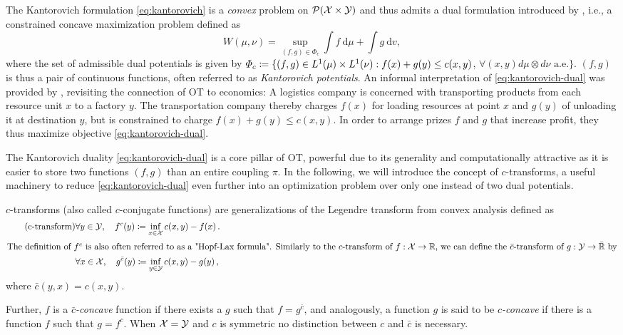 The Kantorovich formulation \eqref{eq:kantorovich} is a \emph{convex} problem on ${\mathcal{P}}(\mathcal{X} \times \mathcal{Y})$ and thus admits a dual formulation introduced by \citet{kantorovich1942transfer}, i.e., a constrained concave maximization problem defined as
\begin{equation} \label{eq:kantorovich-dual}
    W(\mu, \nu)=\sup _{(f, g) \in \Phi_{c}} \int f \mathrm{~d} \mu+\int g \mathrm{~d} v,
\end{equation}
 where the set of admissible dual potentials is given by $\Phi_c \coloneqq \{(f, g) \in L^{1}(\mu) \times L^{1}(\nu): f(x)+g(y) \leq c(x,y)$, $\forall(x, y) d\mu \otimes d\nu \text{ a.e.}\}$.
$(f, g)$ is thus a pair of continuous functions, often referred to as \emph{Kantorovich potentials}.
An informal interpretation of \eqref{eq:kantorovich-dual} was provided by \citet{caffarelli2003monge}, revisiting the connection of \acrshort{OT} to economics: 
A logistics company is concerned with transporting products from each resource unit $x$ to a factory $y$. The transportation company thereby charges $f(x)$ for loading resources at point $x$ and $g(y)$ of unloading it at destination $y$, but is constrained to charge $f(x)+g(y) \le c(x,y)$. In order to arrange prizes $f$ and $g$ that increase profit, they thus maximize objective \eqref{eq:kantorovich-dual}.

The Kantorovich duality \eqref{eq:kantorovich-dual} is a core pillar of \acrlong{OT}, powerful due to its generality and computationally attractive as it is easier to store two functions $(f, g)$ than an entire coupling $\pi$.
In the following, we will introduce the concept of $c$-transforms, a useful machinery to reduce \eqref{eq:kantorovich-dual} even further into an optimization problem over only one instead of two dual potentials.
\begin{definition}[$c$-transform] \label{eq:c-transform} 
	$c$-transforms (also called $c$-conjugate functions) are generalizations of the Legendre transform from convex analysis defined as
\begin{align*} \tag{c-transform}
	& \forall y \in {\mathcal{Y}}, \quad f^c(y) \coloneqq \inf _{x \in {\mathcal{X}}} c(x, y)-f(x) \,. \\
	\intertext{The definition of $f^c$ is also often referred to as a "Hopf-Lax formula". Similarly to the $c$-transform of $f : {\mathcal{X}} \rightarrow \mathbb{R}$, we can define the $\bar{c}$-transform of $g : {\mathcal{Y}} \rightarrow \bar{\mathbb{R}}$ by}
	& \forall x \in {\mathcal{X}}, \quad g^{\bar{c}}(y) \coloneqq \inf _{y \in {\mathcal{Y}}} c(x, y)-g(y) \,,
\end{align*}
where $\bar{c}(y, x) = c(x, y)$. 
\end{definition}
Further, $f$ is a \textit{$\bar{c}$-concave} function if there exists a $g$ such that $f = g^{\bar{c}}$, and analogously, a function $g$ is said to be \textit{$c$-concave} if there is a function $f$ such that $g = f^c$.
When ${\mathcal{X}} = {\mathcal{Y}}$ and $c$ is symmetric no distinction between $c$ and $\bar{c}$ is necessary.

